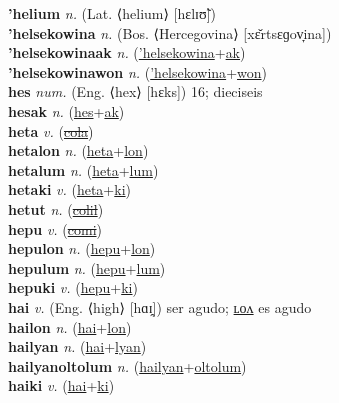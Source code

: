 \textbf{'helium} \textit{n.} (Lat. ⟨helium⟩ [hɛlɪʊ̃])
 \label{'helium} \\
\textbf{'helsekowina} \textit{n.} (Bos. ⟨Hercegovina⟩ [xɛ̌rtsɛɡov̞ina])
 \label{'helsekowina} \\
\textbf{'helsekowinaak} \textit{n.} (\hyperref['helsekowina]{'helsekowina}+\hyperref[ak]{ak})
 \label{'helsekowinaak} \\
\textbf{'helsekowinawon} \textit{n.} (\hyperref['helsekowina]{'helsekowina}+\hyperref[won]{won})
 \label{'helsekowinawon} \\
\textbf{hes} \textit{num.} (Eng. ⟨hex⟩ [hɛks])
16; dieciseis \label{hes} \\
\textbf{hesak} \textit{n.} (\hyperref[hes]{hes}+\hyperref[ak]{ak})
 \label{hesak} \\
\textbf{heta} \textit{v.} (\hyperref[cola]{\sout{cola}})
 \label{heta} \\
\textbf{hetalon} \textit{n.} (\hyperref[heta]{heta}+\hyperref[lon]{lon})
 \label{hetalon} \\
\textbf{hetalum} \textit{n.} (\hyperref[heta]{heta}+\hyperref[lum]{lum})
 \label{hetalum} \\
\textbf{hetaki} \textit{v.} (\hyperref[heta]{heta}+\hyperref[ki]{ki})
 \label{hetaki} \\
\textbf{hetut} \textit{n.} (\hyperref[colil]{\sout{colil}})
 \label{hetut} \\
\textbf{hepu} \textit{v.} (\hyperref[comi]{\sout{comi}})
 \label{hepu} \\
\textbf{hepulon} \textit{n.} (\hyperref[hepu]{hepu}+\hyperref[lon]{lon})
 \label{hepulon} \\
\textbf{hepulum} \textit{n.} (\hyperref[hepu]{hepu}+\hyperref[lum]{lum})
 \label{hepulum} \\
\textbf{hepuki} \textit{v.} (\hyperref[hepu]{hepu}+\hyperref[ki]{ki})
 \label{hepuki} \\
\textbf{hai} \textit{v.} (Eng. ⟨high⟩ [hɑɪ̯])
ser agudo; \hyperref[hailon]{ʟᴏᴧ} es agudo \label{hai} \\
\textbf{hailon} \textit{n.} (\hyperref[hai]{hai}+\hyperref[lon]{lon})
 \label{hailon} \\
\textbf{hailyan} \textit{n.} (\hyperref[hai]{hai}+\hyperref[lyan]{lyan})
 \label{hailyan} \\
\textbf{hailyanoltolum} \textit{n.} (\hyperref[hailyan]{hailyan}+\hyperref[oltolum]{oltolum})
 \label{hailyanoltolum} \\
\textbf{haiki} \textit{v.} (\hyperref[hai]{hai}+\hyperref[ki]{ki})
 \label{haiki} \\
